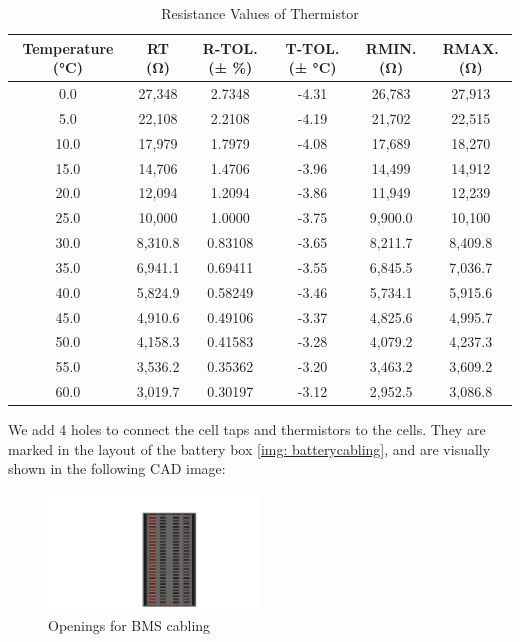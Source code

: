 \begin{table}[ht]
    \centering
    \caption{Resistance Values of Thermistor}
    \label{resistance-values-thermistor1}
    \begin{tabular}{|c|c|c|c|c|c|}
        \toprule
        Temperature (°C) & RT (Ω) & R-TOL. (± \%) & T-TOL. (± °C) & RMIN. (Ω) & RMAX. (Ω) \\
        \midrule
        0.0 & 27,348 & 2.7348 & -4.31 & 26,783 & 27,913 \\
        5.0 & 22,108 & 2.2108 & -4.19 & 21,702 & 22,515 \\
        10.0 & 17,979 & 1.7979 & -4.08 & 17,689 & 18,270 \\
        15.0 & 14,706 & 1.4706 & -3.96 & 14,499 & 14,912 \\
        20.0 & 12,094 & 1.2094 & -3.86 & 11,949 & 12,239 \\
        25.0 & 10,000 & 1.0000 & -3.75 & 9,900.0 & 10,100 \\
        30.0 & 8,310.8 & 0.83108 & -3.65 & 8,211.7 & 8,409.8 \\
        35.0 & 6,941.1 & 0.69411 & -3.55 & 6,845.5 & 7,036.7 \\
        40.0 & 5,824.9 & 0.58249 & -3.46 & 5,734.1 & 5,915.6 \\
        45.0 & 4,910.6 & 0.49106 & -3.37 & 4,825.6 & 4,995.7 \\
        50.0 & 4,158.3 & 0.41583 & -3.28 & 4,079.2 & 4,237.3 \\
        55.0 & 3,536.2 & 0.35362 & -3.20 & 3,463.2 & 3,609.2 \\
        60.0 & 3,019.7 & 0.30197 & -3.12 & 2,952.5 & 3,086.8 \\
        \bottomrule
    \end{tabular}
\end{table}

We add 4 holes to connect the cell taps and thermistors to the cells. They are marked in the layout of the battery box \ref{img: batterycabling}, and are visually shown in the following CAD image:
\begin{figure}[ht]
    \centering
    \includegraphics[width=0.5\textwidth, angle=90]{texfiles/elec/eimg/BatteryPackHoles}
    \caption{Openings for BMS cabling}
\end{figure}
\newline

